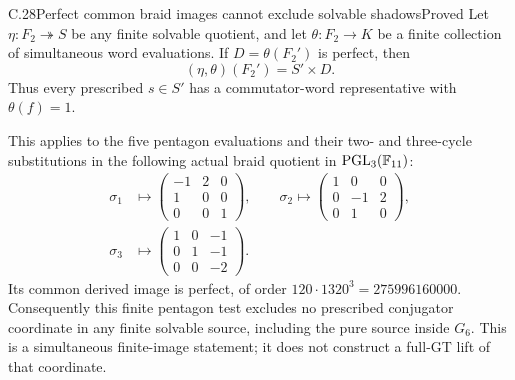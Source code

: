 \begin{statement}{C.28}{Perfect common braid images cannot exclude solvable shadows}{Proved}
Let \(\eta:F_2\twoheadrightarrow S\) be any finite
solvable quotient, and let \(\theta:F_2\to K\) be a
finite collection of simultaneous word evaluations.
If \(D=\theta(F_2')\) is perfect, then
\[
 (\eta,\theta)(F_2')=S'\times D.
 \tag{C.28a}
\]
Thus every prescribed \(s\in S'\) has a commutator-word
representative with \(\theta(f)=1\).

This applies to the five pentagon evaluations and
their two- and three-cycle substitutions in the
following actual braid quotient in
\({\rm PGL}_3(\mathbb F_{11})\):
\[
\begin{split}
 \sigma_1&\longmapsto
 \begin{pmatrix}-1&2&0\\1&0&0\\0&0&1\end{pmatrix},\qquad
 \sigma_2\longmapsto
 \begin{pmatrix}1&0&0\\0&-1&2\\0&1&0\end{pmatrix},\\
 \sigma_3&\longmapsto
 \begin{pmatrix}1&0&-1\\0&1&-1\\0&0&-2\end{pmatrix}.
\end{split}
\tag{C.28b}
\]
Its common derived image is perfect, of order
\(120\cdot1320^3=275996160000\).
Consequently this finite pentagon test excludes no
prescribed conjugator coordinate in any finite solvable
source, including the pure source inside \(G_6\).
This is a simultaneous finite-image statement; it
does not construct a full-GT lift of that coordinate.
\end{statement}
